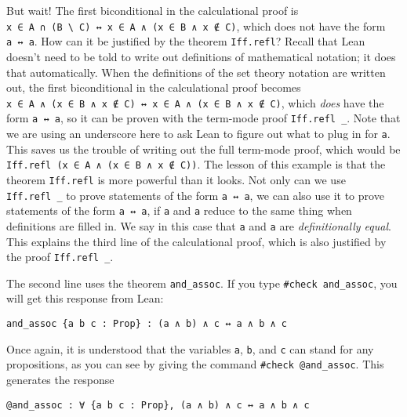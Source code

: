 \documentclass[
  letterpaper,
  DIV=11,
  numbers=noendperiod]{scrreprt}
\newenvironment{ind}
	{\begin{list}{}{\setlength{\leftmargin}{1em}}\item\relax}
	{\end{list}}
\theoremstyle{remark}
\begin{document}
But wait! The first biconditional in the calculational proof is
\texttt{x\ ∈\ A\ ∩\ (B\ \textbackslash{}\ C)\ ↔\ x\ ∈\ A\ ∧\ (x\ ∈\ B\ ∧\ x\ ∉\ C)},
which does not have the form \texttt{a\ ↔\ a}. How can it be justified
by the theorem \texttt{Iff.refl}? Recall that Lean doesn't need to be
told to write out definitions of mathematical notation; it does that
automatically. When the definitions of the set theory notation are
written out, the first biconditional in the calculational proof becomes
\texttt{x\ ∈\ A\ ∧\ (x\ ∈\ B\ ∧\ x\ ∉\ C)\ ↔\ x\ ∈\ A\ ∧\ (x\ ∈\ B\ ∧\ x\ ∉\ C)},
which \emph{does} have the form \texttt{a\ ↔\ a}, so it can be proven
with the term-mode proof \texttt{Iff.refl\ \_}. Note that we are using
an underscore here to ask Lean to figure out what to plug in for
\texttt{a}. This saves us the trouble of writing out the full term-mode
proof, which would be
\texttt{Iff.refl\ (x\ ∈\ A\ ∧\ (x\ ∈\ B\ ∧\ x\ ∉\ C))}. The lesson of
this example is that the theorem \texttt{Iff.refl} is more powerful than
it looks. Not only can we use \texttt{Iff.refl\ \_} to prove statements
of the form \texttt{a\ ↔\ a}, we can also use it to prove statements of
the form \texttt{a\ ↔\ a\textquotesingle{}}, if \texttt{a} and
\texttt{a\textquotesingle{}} reduce to the same thing when definitions
are filled in. We say in this case that \texttt{a} and
\texttt{a\textquotesingle{}} are \emph{definitionally equal}. This
explains the third line of the calculational proof, which is also
justified by the proof \texttt{Iff.refl\ \_}.

The second line uses the theorem \texttt{and\_assoc}. If you type
\texttt{\#check\ and\_assoc}, you will get this response from Lean:

\begin{ind}

\begin{verbatim}
and_assoc {a b c : Prop} : (a ∧ b) ∧ c ↔ a ∧ b ∧ c
\end{verbatim}

\end{ind}

Once again, it is understood that the variables \texttt{a}, \texttt{b},
and \texttt{c} can stand for any propositions, as you can see by giving
the command \texttt{\#check\ @and\_assoc}. This generates the response

\begin{ind}

\begin{verbatim}
@and_assoc : ∀ {a b c : Prop}, (a ∧ b) ∧ c ↔ a ∧ b ∧ c
\end{verbatim}

\end{ind}
\end{document}
